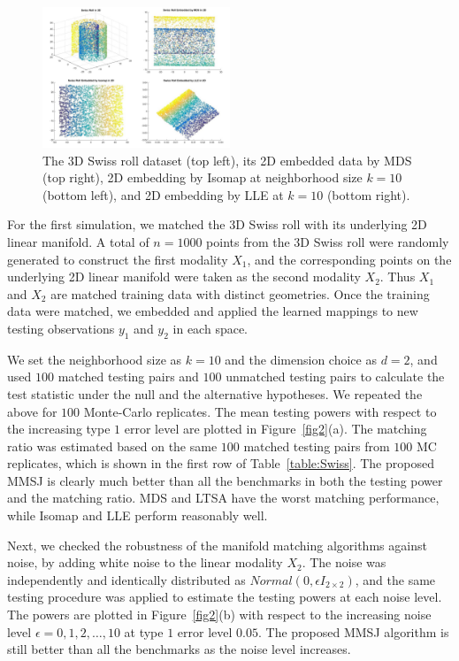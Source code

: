 \documentclass[times,twocolumn,final]{elsarticle}
\begin{document}
\begin{figure}[htbp]
\centering
\includegraphics[width=0.5\textwidth]{Swiss.png}
\caption{The 3D Swiss roll dataset (top left), its 2D embedded data by MDS (top right), 2D embedding by Isomap at neighborhood size $k=10$ (bottom left), and 2D embedding by LLE at $k=10$ (bottom right).}
\label{fig1}
\end{figure}

For the first simulation, we matched the 3D Swiss roll with its underlying 2D linear manifold. A total of $n=1000$ points from the 3D Swiss roll were randomly generated to construct the first modality $X_{1}$, and the corresponding points on the underlying 2D linear manifold were taken as the second modality $X_{2}$. Thus $X_{1}$ and $X_{2}$ are matched training data with distinct geometries. Once the training data were matched, we embedded and applied the learned mappings to new testing observations $y_{1}$ and $y_{2}$ in each space.

We set the neighborhood size as $k=10$ and the dimension choice as $d=2$, and used $100$ matched testing pairs and $100$ unmatched testing pairs to calculate the test statistic under the null and the alternative hypotheses. We repeated the above for $100$ Monte-Carlo replicates. The mean testing powers with respect to the increasing type $1$ error level are plotted in Figure~\ref{fig2}(a). The matching ratio was estimated based on the same $100$ matched testing pairs from $100$ MC replicates, which is shown in the first row of Table~\ref{table:Swiss}. The proposed MMSJ is clearly much better than all the benchmarks in both the testing power and the matching ratio. MDS and LTSA have the worst matching performance, while Isomap and LLE perform reasonably well.

Next, we checked the robustness of the manifold matching algorithms against noise, by adding white noise to the linear modality $X_{2}$. The noise was independently and identically distributed as $Normal(0, \epsilon I_{2 \times 2})$, and the same testing procedure was applied to estimate the testing powers at each noise level. The powers are plotted in Figure~\ref{fig2}(b) with respect to the increasing noise level $\epsilon = 0,1,2,\ldots,10$ at type $1$ error level $0.05$. The proposed MMSJ algorithm is still better than all the benchmarks as the noise level increases.
\end{document}
